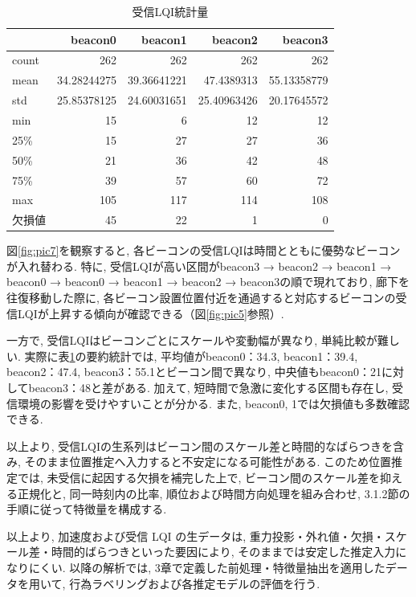 \documentclass[a4paper,12pt]{jreport}
\begin{document}
\begin{table}[tb]
  \centering
  \caption{受信LQI統計量}
  \label{tab:loc_des}
  \renewcommand{\arraystretch}{1.2}
  \begin{tabular}{|l|r|r|r|r|}
    \hline
 & beacon0 & beacon1 & beacon2 & beacon3 \\ \hline
count & 262 & 262 & 262 & 262 \\ \hline
mean & 34.28244275 & 39.36641221 & 47.4389313 & 55.13358779 \\ \hline
std & 25.85378125 & 24.60031651 & 25.40963426 & 20.17645572 \\ \hline
min & 15 & 6 & 12 & 12 \\ \hline
25\% & 15 & 27 & 27 & 36 \\ \hline
50\% & 21 & 36 & 42 & 48 \\ \hline
75\% & 39 & 57 & 60 & 72 \\ \hline
max & 105 & 117 & 114 & 108 \\ \hline
欠損値 & 45 & 22 & 1 & 0 \\ \hline
  \end{tabular}
\end{table}


図\ref{fig:pic7}を観察すると, 各ビーコンの受信LQIは時間とともに優勢なビーコンが入れ替わる. 特に, 受信LQIが高い区間がbeacon3 → beacon2 → beacon1 → beacon0 → beacon0 → beacon1 → beacon2 → beacon3の順で現れており, 廊下を往復移動した際に, 各ビーコン設置位置付近を通過すると対応するビーコンの受信LQIが上昇する傾向が確認できる（図\ref{fig:pic5}参照）. 

一方で, 受信LQIはビーコンごとにスケールや変動幅が異なり, 単純比較が難しい. 実際に表\ref{tab:loc_des}の要約統計では, 平均値がbeacon0：34.3, beacon1：39.4, beacon2：47.4, beacon3：55.1とビーコン間で異なり, 中央値もbeacon0：21に対してbeacon3：48と差がある. 加えて, 短時間で急激に変化する区間も存在し, 受信環境の影響を受けやすいことが分かる. また, beacon0, 1では欠損値も多数確認できる. 

以上より, 受信LQIの生系列はビーコン間のスケール差と時間的なばらつきを含み, そのまま位置推定へ入力すると不安定になる可能性がある. このため位置推定では, 未受信に起因する欠損を補完した上で, ビーコン間のスケール差を抑える正規化と, 同一時刻内の比率,  順位および時間方向処理を組み合わせ, 3.1.2節の手順に従って特徴量を構成する. 

以上より, 加速度および受信 LQI の生データは, 重力投影・外れ値・欠損・スケール差・時間的ばらつきといった要因により, そのままでは安定した推定入力になりにくい. 以降の解析では, 3章で定義した前処理・特徴量抽出を適用したデータを用いて, 行為ラベリングおよび各推定モデルの評価を行う. 
\end{document}
